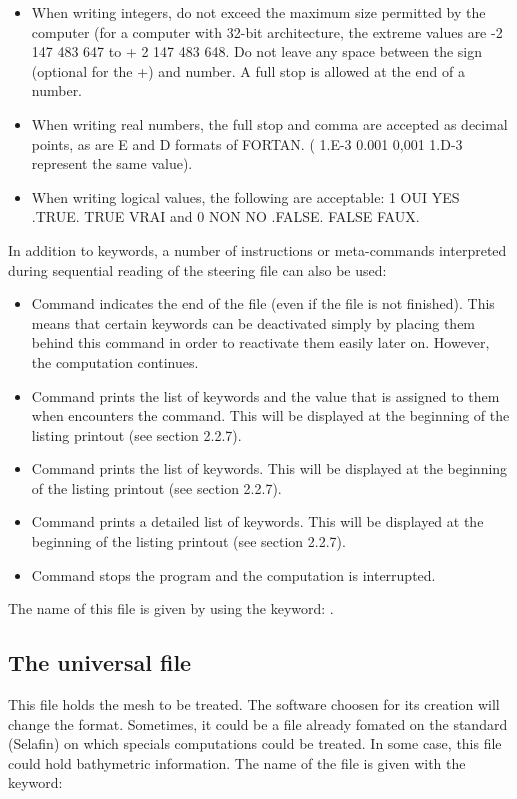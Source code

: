 \begin{itemize}
\begin{lstlisting}[language=TelemacCas]
\end{lstlisting}
\item When writing integers, do not exceed the maximum size permitted by the
computer (for a computer with 32-bit architecture, the extreme values are -2
147 483 647 to + 2 147 483 648. Do not leave any space between the sign
(optional for the +) and number. A full stop is allowed at the end of a number.
\item When writing real numbers, the full stop and comma are accepted as
decimal points, as are E and D formats of FORTAN. ( 1.E-3  0.001  0,001  1.D-3
represent the same value).
\item When writing logical values, the following are acceptable: 1 OUI  YES
.TRUE.  TRUE  VRAI and 0 NON  NO  .FALSE.  FALSE  FAUX.
\end{itemize}
In addition to keywords, a number of instructions or meta-commands interpreted
during sequential reading of the steering file can also be used:
\begin{itemize}
\item Command  indicates the end of the file (even if the file is not
finished). This means that certain keywords can be deactivated simply by
placing them behind this command in order to reactivate them easily later on.
However, the computation continues.
\item Command  prints the list of keywords and the value that is assigned
to them when \damo encounters the command. This will be displayed at the
beginning of the listing printout (see section 2.2.7).
\item Command  prints the list of keywords. This will be displayed at the
beginning of the listing printout (see section 2.2.7).
\item Command  prints a detailed list of keywords. This will be displayed
at the beginning of the listing printout (see section 2.2.7).
\item Command  stops the program and the computation is interrupted.
\end{itemize}
The name of this file is given by using the keyword: .

\subsection{The universal file}
This file holds the mesh to be treated. The software choosen for its creation
will change the format. Sometimes, it could be a file already fomated on the
\telemacsystem standard (Selafin) on which specials computations could be
treated.
In some case, this file could hold bathymetric information.
The name of the file is given with the keyword: 

